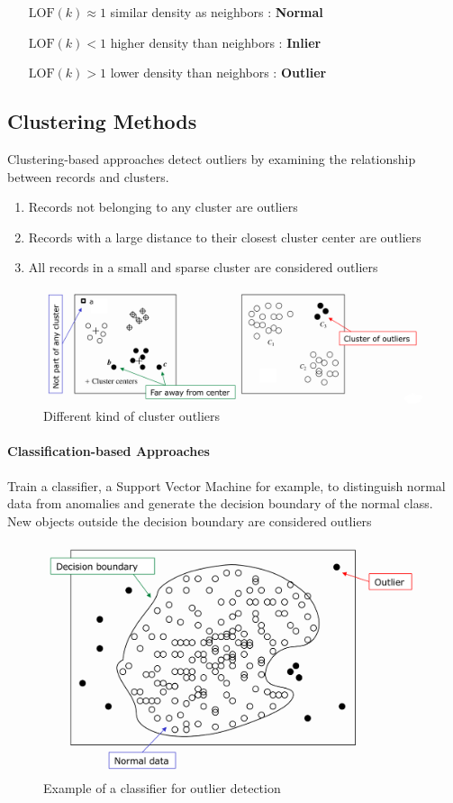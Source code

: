 \documentclass[a4paper, 11pt]{article}
\begin{document}
\begin{itemize}[leftmargin=*, labelindent=2cm, labelsep=1cm]
    \item[$\text{LOF}(k) \approx 1$] similar density as neighbors : \textbf{Normal}
    \item[$\text{LOF}(k) < 1$] higher density than neighbors : \textbf{Inlier}
    \item[$\text{LOF}(k) > 1$]  lower density than neighbors : \textbf{Outlier}
\end{itemize}

\subsection{Clustering Methods}

Clustering-based approaches detect outliers by examining the relationship between records and clusters.

\begin{enumerate}
    \item Records not belonging to any cluster are outliers
    \item Records with a large distance to their closest cluster center are outliers
    \item All records in a small and sparse cluster are considered outliers
\end{enumerate}

\begin{figure}[tbh!]
    \centering
    \includegraphics[width=0.7\linewidth, keepaspectratio]{Pictures/outlier_clustering_method}
    \caption{Different kind of cluster outliers}
    \label{fig:outlierclusteringmethod}
\end{figure}

\paragraph{Classification-based Approaches}

Train a classifier, a Support Vector Machine for example, to distinguish normal data from anomalies and generate the decision boundary of the normal class. New objects outside the decision boundary are considered outliers

\begin{figure}[tbh!]
    \centering
    \includegraphics[width=0.7\linewidth, keepaspectratio]{Pictures/outlier_clustering_method_classification}
    \caption{Example of a classifier for outlier detection}
    \label{fig:outlierclusteringmethodclassification}
\end{figure}
\end{document}
